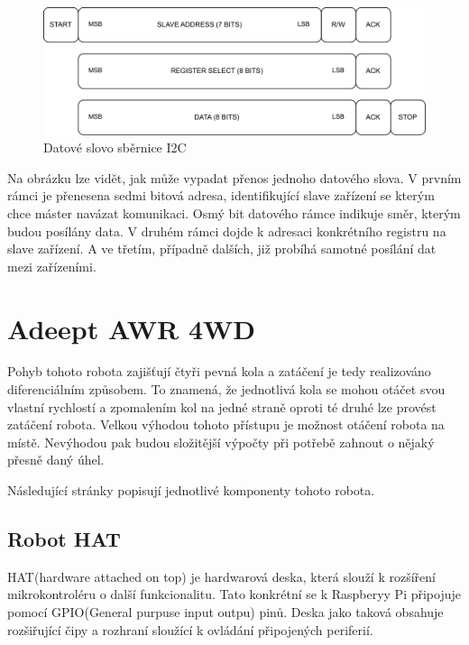 \begin{figure}[h!]
	\centering
	\includegraphics[scale=0.75]{obrazky-figures/i2c_data_word.pdf}
	\caption{Datové slovo sběrnice I2C}
	\label{}
\end{figure}

Na obrázku lze vidět, jak může vypadat přenos jednoho datového slova. V prvním rámci je přenesena sedmi bitová adresa, identifikující slave zařízení se kterým chce máster navázat komunikaci. Osmý bit datového rámce indikuje směr, kterým budou posílány data. V druhém rámci dojde k adresaci konkrétního registru na slave zařízení. A ve třetím, případně dalších, již probíhá samotné posílání dat mezi zařízeními. \cite{an4481}

\section{Adeept AWR 4WD}
Pohyb tohoto robota zajišťují čtyři pevná kola a zatáčení je tedy realizováno diferenciálním způsobem. To znamená, že jednotlivá kola se mohou otáčet svou vlastní rychlostí a zpomalením kol na jedné straně oproti té druhé lze provést zatáčení robota. Velkou výhodou tohoto přístupu je možnost otáčení robota na místě. Nevýhodou pak budou složitější výpočty při potřebě zahnout o nějaký přesně daný úhel.

\noindent Následující stránky popisují jednotlivé komponenty tohoto robota.

\subsection*{Robot HAT}
HAT(hardware attached on top) je hardwarová deska, která slouží k rozšíření mikrokontroléru o další funkcionalitu. Tato konkrétní se k Raspberyy Pi připojuje pomocí GPIO(General purpuse input outpu) pinů. Deska jako taková obsahuje rozšiřující čipy a rozhraní sloužící k ovládání připojených periferií.

